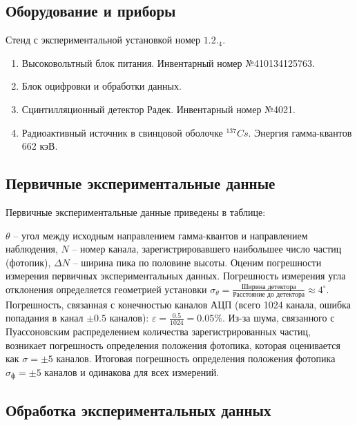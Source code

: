 \documentclass[10pt,a4paper]{article}
\begin{document}
	\subsection*{Оборудование и приборы}
		
	Стенд с экспериментальной установкой номер $1.2._4$.
	\begin{enumerate}				
		\item Высоковольтный блок питания. Инвентарный номер №410134125763.
		
		\item Блок оцифровки и обработки данных.
		
		\item Сцинтилляционный детектор Радек. Инвентарный номер №4021.
				
		\item Радиоактивный источник в свинцовой оболочке ${}^{137}Cs$. Энергия гамма-квантов 662 кэВ.
	\end{enumerate}
	
	\subsection*{Первичные экспериментальные данные}
	
	Первичные экспериментальные данные приведены в таблице:\\
	\begin{center}
		
	\end{center}

	
	$\theta$ -- угол между исходным направлением гамма-квантов и направлением наблюдения, $N$ -- номер канала, зарегистрировавшего наибольшее число частиц (фотопик), $\Delta N$ -- ширина пика по половине высоты. Оценим погрешности измерения первичных экспериментальных данных. Погрешность измерения угла отклонения определяется геометрией установки $\sigma_\theta = \frac{\text{Ширина детектора}}{\text{Расстояние до детектора}} \approx 4^\circ$. Погрешность, связанная с конечностью каналов АЦП (всего 1024 канала, ошибка попадания в канал $\pm 0.5$ каналов): $\varepsilon = \frac{0.5}{1024} = 0.05 \%$. Из-за шума, связанного с Пуассоновским распределением количества зарегистрированных частиц, возникает погрешность определения положения фотопика, которая оценивается как $\sigma = \pm 5$ каналов. Итоговая погрешность определения положения фотопика $\sigma_ф = \pm 5$ каналов и одинакова для всех измерений.
	
	\subsection*{Обработка экспериментальных данных}
	
\end{document}
